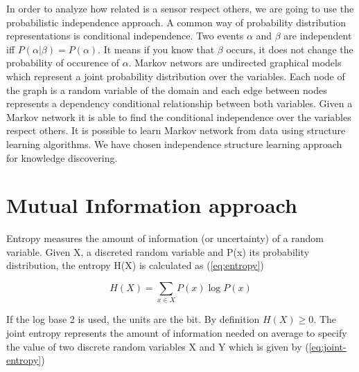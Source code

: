 \documentclass[final,a4paper]{llncs}
\begin{document}
In order to analyze how related is a sensor respect others, we are going to use the 
probabilistic independence approach. A common way of probability distribution 
representations is conditional independence. Two events $\alpha$ and $\beta$ 
are independent iff $P(\alpha | \beta)=P(\alpha)$. It means if you know
that $\beta$ occurs, it does not change the probability of occurence of $\alpha$.
Markov networs are undirected graphical models which represent a joint probability
distribution over the variables. Each node of the graph is a random variable of the domain
and each edge between nodes represents a dependency conditional relationship
between both variables. Given a Markov network it is able to find the conditional 
independence over the 
variables respect others. It is possible to learn Markov network from data using structure
learning algorithms. We have chosen independence structure learning approach 
\cite{schluter2012survey} for knowledge discovering.


\section{ Mutual Information approach}


Entropy  measures the amount of information (or uncertainty)
of a random variable. Given X, a discreted random variable and P(x) its probability distribution,
the entropy H(X) is calculated as (\ref{eq:entropy})

\begin{equation}\label{eq:entropy}
H(X)=\sum_{x\in X}P(x) \log P(x)
\end{equation}

If the log base 2 is used, the units are the bit. By definition $H(X) \geq 0$. 
The joint entropy represents the amount of information needed on
average to specify the value of two discrete random variables X and Y which
is given by (\ref{eq:joint-entropy})
\end{document}
